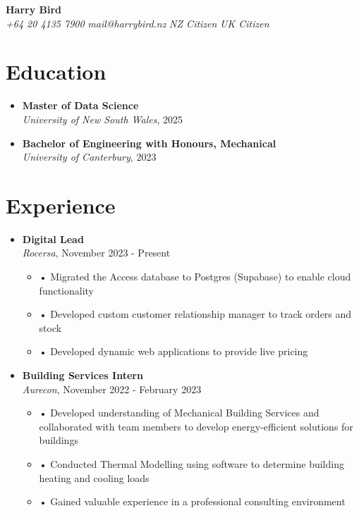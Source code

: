 \documentclass[a4paper,10pt]{article}
\begin{document}
\begin{center}
    {\Huge \textbf{Harry Bird}} \\
    \vspace{0.5cm}
    \textit{+64 20 4135 7900} 
    \textit{mail@harrybird.nz} 
    \textit{NZ Citizen} 
    \textit{UK Citizen} \\
\end{center}

\vspace{1cm}

\section*{Education}
\begin{itemize}
    \item \textbf{Master of Data Science} \\
    \textit{University of New South Wales}, 2025
    \item \textbf{Bachelor of Engineering with Honours, Mechanical} \\
    \textit{University of Canterbury}, 2023
\end{itemize}

\vspace{0.5cm}

\section*{Experience}
\begin{itemize}
    \item \textbf{Digital Lead} \\
    \textit{Rocersa}, November 2023 - Present \\
    \begin{itemize}
        \item •	Migrated the Access database to Postgres (Supabase) to enable cloud functionality
        \item •	Developed custom customer relationship manager to track orders and stock
        \item •	Developed dynamic web applications to provide live pricing
    \end{itemize}
    \item \textbf{Building Services Intern} \\
    \textit{Aurecon}, November 2022 - February 2023 \\
    \begin{itemize}
        \item •	Developed understanding of Mechanical Building Services and collaborated with team members to develop energy-efficient solutions for buildings
        \item •	Conducted Thermal Modelling using software to determine building heating and cooling loads
        \item • Gained valuable experience in a professional consulting environment
    \end{itemize}
\end{itemize}
\end{document}
